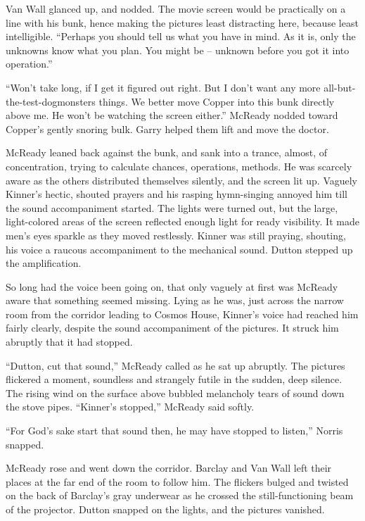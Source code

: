 \documentclass[ebook,oneside,11pt]{memoir}				%
\begin{document}
Van Wall glanced up, and nodded. The movie screen would be practically on a line with his bunk, hence making the pictures least distracting here, because least intelligible. ``Perhaps you should tell us what you have in mind. As it is, only the unknowns know what you plan. You might be -- unknown before you got it into operation.''

``Won't take long, if I get it figured out right. But I don't want any more all-but-the-test-dogmonsters things. We better move Copper into this bunk directly above me. He won't be watching the screen either.'' McReady nodded toward Copper's gently snoring bulk. Garry helped them lift and move the doctor.

McReady leaned back against the bunk, and sank into a trance, almost, of concentration, trying to calculate chances, operations, methods. He was scarcely aware as the others distributed themselves silently, and the screen lit up. Vaguely Kinner's hectic, shouted prayers and his rasping hymn-singing annoyed him till the sound accompaniment started. The lights were turned out, but the large, light-colored areas of the screen reflected enough light for ready visibility. It made men's eyes sparkle as they moved restlessly. Kinner was still praying, shouting, his voice a raucous accompaniment to the mechanical sound. Dutton stepped up the amplification.

So long had the voice been going on, that only vaguely at first was McReady aware that something seemed missing. Lying as he was, just across the narrow room from the corridor leading to Cosmos House, Kinner's voice had reached him fairly clearly, despite the sound accompaniment of the pictures. It struck him abruptly that it had stopped.

``Dutton, cut that sound,'' McReady called as he sat up abruptly. The pictures flickered a moment, soundless and strangely futile in the sudden, deep silence. The rising wind on the surface above bubbled melancholy tears of sound down the stove pipes. ``Kinner's stopped,'' McReady said softly.

``For God's sake start that sound then, he may have stopped to listen,'' Norris snapped.

McReady rose and went down the corridor. Barclay and Van Wall left their places at the far end of the room to follow him. The flickers bulged and twisted on the back of Barclay's gray underwear as he crossed the still-functioning beam of the projector. Dutton snapped on the lights, and the pictures vanished.
\end{document}

